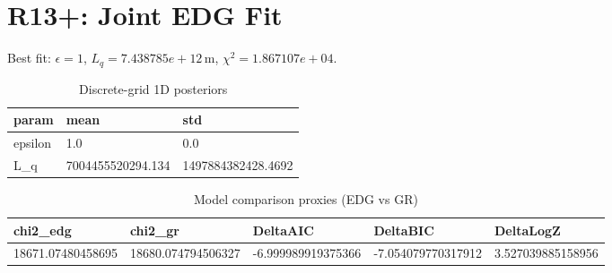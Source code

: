 \section{R13+: Joint EDG Fit}
Best fit: $\epsilon = 1$, $L_q = 7.438785e+12\,\mathrm{m}$, $\chi^2 = 1.867107e+04$.
\begin{table}[h!]
\centering
\caption{Discrete-grid 1D posteriors}
\label{tab:r13p_marg}
\begin{tabular}{l | l | l}
\hline
param & mean & std \\
\hline
epsilon & 1.0 & 0.0 \\
L_q & 7004455520294.134 & 1497884382428.4692 \\
\hline
\end{tabular}
\end{table}

\begin{table}[h!]
\centering
\caption{Model comparison proxies (EDG vs GR)}
\label{tab:r13p_model}
\begin{tabular}{l | l | l | l | l}
\hline
chi2_edg & chi2_gr & DeltaAIC & DeltaBIC & DeltaLogZ \\
\hline
18671.07480458695 & 18680.074794506327 & -6.999989919375366 & -7.054079770317912 & 3.527039885158956 \\
\hline
\end{tabular}
\end{table}


